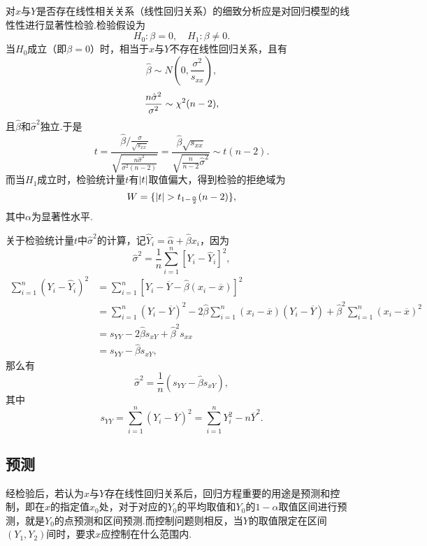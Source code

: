 对\(x\)与\(Y\)是否存在线性相关关系（线性回归关系）的细致分析应是对回归模型的线性性进行显著性检验.检验假设为\begin{equation*}
H_0: \beta = 0, \quad H_1: \beta \neq 0.
\end{equation*}当\(H_0\)成立（即\(\beta = 0\)）时，相当于\(x\)与\(Y\)不存在线性回归关系，且有\begin{equation*}
\hat{\beta} \sim N\left(0, \frac{\sigma^2}{s_{xx}}\right),
\end{equation*}\begin{equation*}
\frac{n \hat{\sigma}^2}{\sigma^2} \sim \chi^2(n-2),
\end{equation*}且\(\hat{\beta}\)和\(\hat{\sigma}^2\)独立.于是\begin{equation*}
t = \frac{\hat{\beta} / \frac{\sigma}{\sqrt{s_{xx}}}}{\sqrt{\frac{n\hat{\sigma}^2}{\sigma^2(n-2)}}}
= \frac{\hat{\beta} \sqrt{s_{xx}}}{\sqrt{\frac{n}{n-2} \hat{\sigma}^2}}
\sim t(n-2).
\end{equation*}而当\(H_1\)成立时，检验统计量\(t\)有\(\abs{t}\)取值偏大，得到检验的拒绝域为\begin{equation*}
W = \{ \abs{t} > t_{1-\frac{\alpha}{2}}(n-2) \},
\end{equation*}其中\(\alpha\)为显著性水平.

关于检验统计量\(t\)中\(\hat{\sigma}^2\)的计算，记\(\hat{Y}_i = \hat{\alpha}+\hat{\beta} x_i\)，因为\begin{equation*}
\hat{\sigma}^2 = \frac{1}{n} \sum_{i=1}^n[Y_i-\hat{Y}_i]^2,
\end{equation*}\begin{align*}
\sum_{i=1}^n(Y_i-\hat{Y}_i)^2
&= \sum_{i=1}^n[Y_i-\overline{Y}-\hat{\beta}(x_i-\overline{x})]^2 \\
&= \sum_{i=1}^n(Y_i-\overline{Y})^2
	-2\hat{\beta} \sum_{i=1}^n(x_i-\overline{x})(Y_i-\overline{Y})
	+\hat{\beta}^2 \sum_{i=1}^n(x_i-\overline{x})^2 \\
&= s_{YY} - 2 \hat{\beta} s_{xY} + \hat{\beta}^2 s_{xx} \\
&= s_{YY} - \hat{\beta} s_{xY},
\end{align*}那么有\begin{equation*}
\hat{\sigma}^2 = \frac{1}{n} (s_{YY} - \hat{\beta} s_{xY}),
\end{equation*}其中\begin{equation*}
s_{YY} = \sum_{i=1}^n(Y_i - \overline{Y})^2
= \sum_{i=1}^n{Y_i^2 - n\overline{Y}^2}.
\end{equation*}

\subsection{预测}
经检验后，若认为\(x\)与\(Y\)存在线性回归关系后，回归方程重要的用途是预测和控制，即在\(x\)的指定值\(x_0\)处，对于对应的\(Y_0\)的平均取值和\(Y_0\)的\(1-\alpha\)取值区间进行预测，就是\(Y_0\)的点预测和区间预测.而控制问题则相反，当\(Y\)的取值限定在区间\((Y_1,Y_2)\)间时，要求\(x\)应控制在什么范围内.
